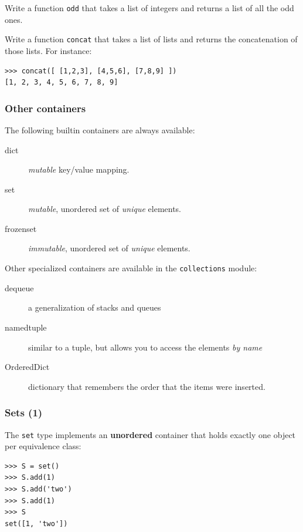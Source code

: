\documentclass[english,serif,mathserif,xcolor=pdftex,dvipsnames,table]{beamer}
\begin{document}

\begin{frame}[fragile]
  \begin{exercise}
    Write a function \texttt{odd} that takes a list of integers and
    returns a list of all the odd ones.
  \end{exercise}

  \+
  \begin{exercise}
    Write a function \texttt{concat} that takes a list of lists and
    returns the concatenation of those lists. For instance:
    \begin{lstlisting}
>>> concat([ [1,2,3], [4,5,6], [7,8,9] ])
[1, 2, 3, 4, 5, 6, 7, 8, 9]      
    \end{lstlisting}
  \end{exercise}
\end{frame}


\begin{frame}
  \frametitle{Other containers}

  The following builtin containers are always available:
  \begin{description}
  \item[dict] \textit{mutable} key/value mapping.
  \item[set] \textit{mutable}, unordered set of \textit{unique} elements.
  \item[frozenset] \textit{immutable}, unordered set of
    \textit{unique} elements.
  \end{description}

  \pause
  Other specialized containers are available in the
  \texttt{collections} module:

  \begin{description}
  \item[dequeue] a generalization of stacks and queues
  \item[namedtuple] similar to a tuple, but allows you to access the
    elements \textit{by name}
  \item[OrderedDict] dictionary that remembers the order that the
    items were inserted.
  \end{description}
\end{frame}


\begin{frame}[fragile]
  \frametitle{Sets (1)} The \texttt{set} type implements an
  \textbf{unordered} container that holds exactly one object per
  equivalence class:
\begin{lstlisting}
>>> S = set()
>>> S.add(1)
>>> S.add('two')
>>> S.add(1)
>>> S
set([1, 'two'])
\end{lstlisting}

\end{frame}
\end{document}
